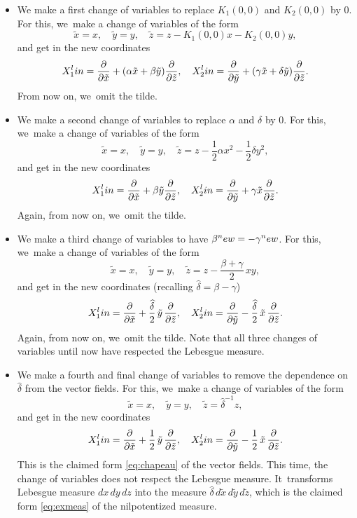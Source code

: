 \documentclass[11pt]{article}
\newcommand{\lin}{\textup{lin}}
\newcommand{\new}{\textup{new}}
\theoremstyle{definition}
\newcommand{\1}{\mathbbm{1}}
\numberwithin{equation}{section}
\begin{document}
\begin{itemize}
\item We make a first change of variables to replace $K_1(0,0)$ and $K_2(0,0)$ by $0$.
For this, we~make a change of variables of the form
\[
\tilde x = x,\quad
\tilde y =y,\quad \tilde z = z - K_1(0,0) x - K_2(0,0) y,
\]
and get in the new coordinates
\[
X_1^\lin= \frac{\partial}{\partial \tilde x} + (\alpha \tilde x + \beta \tilde y) \frac{\partial}{\partial \tilde z},\quad
X_2^\lin= \frac{\partial}{\partial \tilde y} +(\gamma \tilde x + \delta \tilde y) \frac{\partial}{\partial \tilde z}.
\]
From now on, we~omit the tilde.
\item We make a second change of variables to replace $\alpha$ and $\delta$ by $0$.
For this, we~make a change of variables of the form
\[
\tilde x = x,\quad \tilde y =y,\quad \tilde z = z - \frac 12 \alpha x^2 - \frac 12 \delta y^2,
\]
and get in the new coordinates
\[
X_1^\lin= \frac{\partial}{\partial \tilde x} + \beta \tilde y \frac{\partial}{\partial \tilde z},\quad
X_2^\lin= \frac{\partial}{\partial \tilde y} + \gamma \tilde x \frac{\partial}{\partial \tilde z}.
\]
Again, from now on, we~omit the tilde.
\item We make a third change of variables to have $\beta^\new = - \gamma^\new$.
For this, we~make a change of variables of the form
\[
\tilde x = x,\quad \tilde y =y,\quad \tilde z = z - \frac{\beta+\gamma}2\,xy,
\]
and get in the new coordinates (recalling $\widehat\delta = \beta - \gamma$)
\[
X_1^\lin= \frac{\partial}{\partial \tilde x} + \frac{\widehat\delta}{2}\,\tilde y\,\frac{\partial}{\partial \tilde z},\quad
X_2^\lin= \frac{\partial}{\partial \tilde y} - \frac{\widehat\delta}{2}\,\tilde x\,\frac{\partial}{\partial \tilde z}.
\]
Again, from now on, we~omit the tilde.
Note that all three changes of variables until now have respected the Lebesgue measure.
\item We make a fourth and final change of variables to remove the dependence on $\widehat\delta$ from the vector fields.
For this, we~make a change of variables of the form
\[
\tilde x = x,\quad \tilde y =y,\quad \tilde z = \widehat \delta^{-1} z,
\]
and get in the new coordinates
\[
X_1^\lin= \frac{\partial}{\partial \tilde x} + \frac{1}{2}\,\tilde y\,\frac{\partial}{\partial \tilde z},\quad
X_2^\lin= \frac{\partial}{\partial \tilde y} - \frac{1}{2}\,\tilde x\,\frac{\partial}{\partial \tilde z}.
\]
This is the claimed form \eqref{eq:chapeau} of the vector fields.
This time, the change of variables does not respect the Lebesgue measure. It~transforms Lebesgue measure $dx\,dy\,dz$ into the measure $\widehat\delta\,d\tilde x\,d\tilde y\,d\tilde z$, which is the claimed form \eqref{eq:exmeas} of the nilpotentized measure.
\end{itemize}
\end{document}
